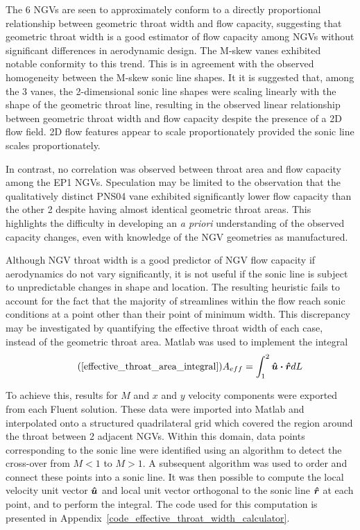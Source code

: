 \documentclass[a4paper, 11pt, oneside]{report}
\begin{document}
The 6 NGVs are seen to approximately conform to a directly proportional relationship between geometric throat width and flow capacity, suggesting that geometric throat width is a good estimator of flow capacity among NGVs without significant differences in aerodynamic design. The M-skew vanes exhibited notable conformity to this trend. This is in agreement with the observed homogeneity between the M-skew sonic line shapes. It it is suggested that, among the 3 vanes, the 2-dimensional sonic line shapes were scaling linearly with the shape of the geometric throat line, resulting in the observed linear relationship between geometric throat width and flow capacity despite the presence of a 2D flow field. 2D flow features appear to scale proportionately provided the sonic line scales proportionately.

In contrast, no correlation was observed between throat area and flow capacity among the EP1 NGVs. Speculation may be limited to the observation that the qualitatively distinct PNS04 vane exhibited significantly lower flow capacity than the other 2 despite having almost identical geometric throat areas. This highlights the difficulty in developing an \textit{a priori} understanding of the observed capacity changes, even with knowledge of the NGV geometries as manufactured.

Although NGV throat width is a good predictor of NGV flow capacity if aerodynamics do not vary significantly, it is not useful if the sonic line is subject to unpredictable changes in shape and location. The resulting heuristic fails to account for the fact that the majority of streamlines within the flow reach sonic conditions at a point other than their point of minimum width. This discrepancy may be investigated by quantifying the effective throat width of each case, instead of the geometric throat area. Matlab was used to implement the integral
\begin{equation}\tag{\ref{effective_throat_area_integral}}
	A_{eff} = 
	\int_{1}^2 \vu*{u} \vdot \vu*{r} dL
\end{equation}

To achieve this, results for $M$ and $x$ and $y$ velocity components were exported from each Fluent solution. These data were imported into Matlab and interpolated onto a structured quadrilateral grid which covered the region around the throat between 2 adjacent NGVs. Within this domain, data points corresponding to the sonic line were identified using an algorithm to detect the cross-over from $M<1$ to $M>1$. A subsequent algorithm was used to order and connect these points into a sonic line. It was then possible to compute the local velocity unit vector $\vu*{u}$ and local unit vector orthogonal to the sonic line $\vu*{r}$ at each point, and to perform the integral. The code used for this computation is presented in Appendix~\ref{code_effective_throat_width_calculator}. 
\end{document}
